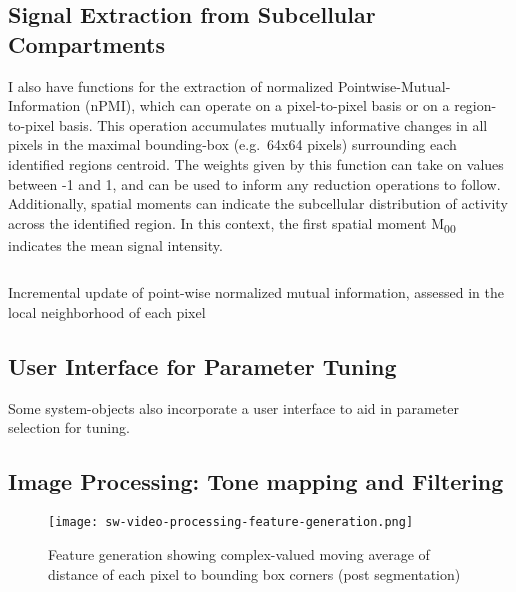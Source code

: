 \documentclass[../main.tex]{subfiles}
\begin{document}
\subsection{Signal Extraction from Subcellular Compartments}\label{sec:signal-extraction-from-subcellular-compartments}

I also have functions for the extraction of normalized Pointwise-Mutual-Information (nPMI), which can operate on a pixel-to-pixel basis or on a region-to-pixel basis.
This operation accumulates mutually informative changes in all pixels in the maximal bounding-box (e.g.~64x64 pixels) surrounding each identified regions centroid.
The weights given by this function can take on values between -1 and 1, and can be used to inform any reduction operations to follow.
Additionally, spatial moments can indicate the subcellular distribution of activity across the identified region.
In this context, the first spatial moment M\textsubscript{00} indicates the mean signal intensity.

\begin{listing}[ht]
\inputminted{matlab}{pointwiseMutualInformationRunGpuKernel.m}
\caption{Incremental update of point-wise normalized mutual information, assessed in the local neighborhood of each pixel}
\label{listing:npmi}
\end{listing}

\subsection{User Interface for Parameter Tuning}\label{sec:user-interface-for-parameter-tuning}

Some system-objects also incorporate a user interface to aid in parameter selection for tuning.

\subsection{Image Processing: Tone mapping and Filtering}\label{sec:image-processing-tonemapping-and-filtering}
\begin{figure}[htb]\centering
	\texttt{[image: sw-video-processing-feature-generation.png]}
	\caption{Feature generation showing complex-valued moving average of distance of each pixel to bounding box corners (post segmentation)}
\end{figure}

\end{document}
